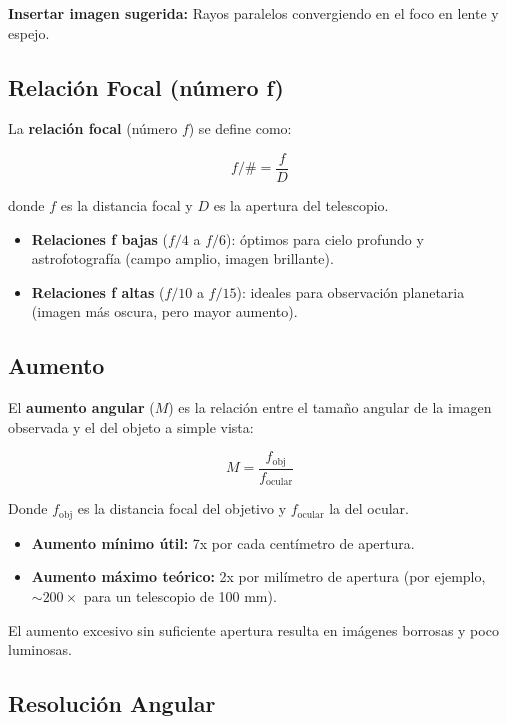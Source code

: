 \vspace{0.3cm}
\textbf{Insertar imagen sugerida:} Rayos paralelos convergiendo en el foco en lente y espejo.

\subsection{Relación Focal (número f)}
\label{subsec:rel_focal}

La \textbf{relación focal} (número $f$) se define como:

\[
f/\# = \frac{f}{D}
\]

donde $f$ es la distancia focal y $D$ es la apertura del telescopio.

\begin{itemize}
	\item \textbf{Relaciones f bajas} ($f/4$ a $f/6$): óptimos para cielo profundo y astrofotografía (campo amplio, imagen brillante).
	\item \textbf{Relaciones f altas} ($f/10$ a $f/15$): ideales para observación planetaria (imagen más oscura, pero mayor aumento).
\end{itemize}

\subsection{Aumento}
\label{subse:aumento_resolucion}

El \textbf{aumento angular} ($M$) es la relación entre el tamaño angular de la imagen observada y el del objeto a simple vista:

\[
M = \frac{f_\text{obj}}{f_\text{ocular}}
\]

Donde $f_\text{obj}$ es la distancia focal del objetivo y $f_\text{ocular}$ la del ocular.

\begin{itemize}
	\item \textbf{Aumento mínimo útil:} 7x por cada centímetro de apertura.
	\item \textbf{Aumento máximo teórico:} 2x por milímetro de apertura (por ejemplo, $\sim200\times$ para un telescopio de 100 mm).
\end{itemize}

El aumento excesivo sin suficiente apertura resulta en imágenes borrosas y poco luminosas.

\subsection{Resolución Angular}

